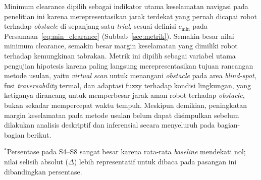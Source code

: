 Minimum clearance dipilih sebagai indikator utama keselamatan navigasi pada
penelitian ini karena merepresentasikan jarak terdekat yang pernah dicapai
robot terhadap \textit{obstacle} di sepanjang satu \textit{trial}, sesuai
definisi $c_\text{min}$ pada Persamaan~\ref{eq:min_clearance}
(Subbab~\ref{sec:metrik}). Semakin besar nilai minimum clearance, semakin
besar margin keselamatan yang dimiliki robot terhadap kemungkinan tabrakan.
Metrik ini dipilih sebagai variabel utama pengujian hipotesis karena paling
langsung merepresentasikan tujuan rancangan metode usulan, yaitu
\textit{virtual scan} untuk menangani \textit{obstacle} pada area
\textit{blind-spot}, fusi \textit{traversability} termal, dan adaptasi
fuzzy terhadap kondisi lingkungan, yang ketiganya dirancang untuk
memperbesar jarak aman robot terhadap \textit{obstacle}, bukan sekadar
mempercepat waktu tempuh. Meskipun demikian, peningkatan margin keselamatan
pada metode usulan belum dapat disimpulkan sebelum dilakukan analisis
deskriptif dan inferensial secara menyeluruh pada bagian-bagian berikut.

\begin{table}[H]
\centering
\caption{Perbandingan minimum clearance rata-rata antara konfigurasi
\textit{baseline} dan \textit{proposed method} pada keempat pasangan
skenario.}
\label{tab:clearance_deskriptif}
\vspace{1mm}

{\footnotesize $^{*}$Persentase pada S4--S8 sangat besar karena rata-rata
\textit{baseline} mendekati nol; nilai selisih absolut ($\Delta$) lebih
representatif untuk dibaca pada pasangan ini dibandingkan persentase.}
\end{table}

